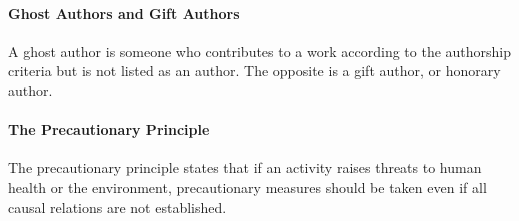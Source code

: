 \paragraph{Ghost Authors and Gift Authors}
A ghost author is someone who contributes to a work according to the authorship criteria but is not listed as an author. The opposite is a gift author, or honorary author.

\paragraph{The Precautionary Principle}
The precautionary principle states that if an activity raises threats to human health or the environment, precautionary measures should be taken even if all causal relations are not established.